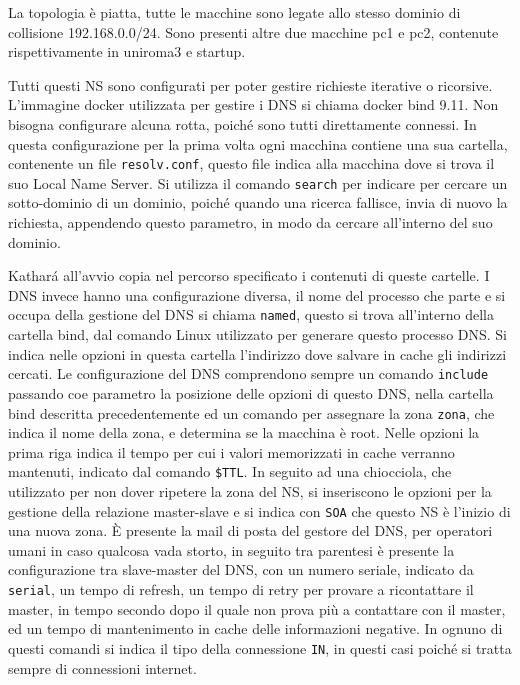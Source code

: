 \documentclass{article}
\numberwithin{equation}{subsection}
\begin{document}
La topologia è piatta, tutte le macchine sono legate allo stesso dominio di collisione 192.168.0.0/24. Sono presenti altre due macchine 
pc1 e pc2, contenute rispettivamente in uniroma3 e startup. 

Tutti questi NS sono configurati per poter gestire richieste iterative o ricorsive. 
L'immagine docker utilizzata per gestire i DNS si chiama docker bind 9.11. %
Non bisogna configurare alcuna rotta, poiché sono tutti direttamente connessi. In questa configurazione per la prima volta ogni macchina contiene una sua cartella, 
contenente un file \texttt{resolv.conf}, questo file indica alla macchina dove si trova il suo Local Name Server. 
Si utilizza il comando \texttt{search} per indicare per cercare un sotto-dominio di un dominio, poiché quando una ricerca fallisce, invia di nuovo la richiesta, appendendo 
questo parametro, in modo da cercare all'interno del suo dominio. 

Kathar\'{a} all'avvio copia nel percorso specificato i contenuti di queste cartelle. I DNS invece hanno una configurazione diversa, il nome del processo che parte e 
si occupa della gestione del DNS si chiama \texttt{named}, questo si trova all'interno della cartella bind, dal comando Linux utilizzato per generare questo processo 
DNS. Si indica nelle opzioni in questa cartella l'indirizzo dove salvare in cache gli indirizzi cercati. 
Le configurazione del DNS comprendono sempre un comando \texttt{include} passando coe parametro la posizione delle opzioni di questo DNS, nella cartella bind descritta 
precedentemente ed un comando per assegnare la zona \texttt{zona}, che indica il nome della zona, e determina se la macchina è root. 
Nelle opzioni la prima riga indica il tempo per cui i valori memorizzati in cache verranno mantenuti, indicato dal comando \texttt{\$TTL}. 
In seguito ad una chiocciola, che utilizzato per non dover ripetere 
la zona del NS, si inseriscono le opzioni 
per la gestione della relazione master-slave e si indica con \texttt{SOA} che questo NS è l'inizio di una nuova zona. \`{E} presente la mail di posta del gestore 
del DNS, per operatori umani in caso qualcosa vada storto, in seguito 
tra parentesi è presente la configurazione tra slave-master del DNS, con 
un numero seriale, indicato da \texttt{serial}, un tempo di refresh, un 
tempo di retry per provare a ricontattare il master, in tempo secondo dopo 
il quale non prova più a contattare con il master, ed un tempo di 
mantenimento in cache delle informazioni negative. 
In ognuno di questi comandi si indica il tipo della connessione \texttt{IN}, in questi casi poiché si tratta sempre di connessioni internet. 
\end{document}
